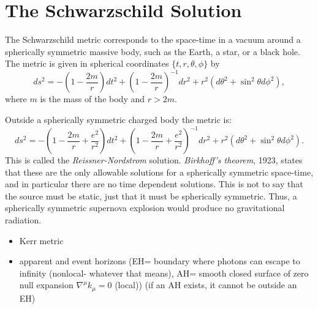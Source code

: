 \section{The Schwarzschild Solution}
The Schwarzschild metric corresponds to the space-time in a vacuum around a spherically symmetric massive body, such as the Earth, a star, or a black hole. The metric is given in spherical coordinates $\{t,r,\theta,\phi\}$ by
\begin{equation} d s^2 = -\left(1-\frac{2m}{r}\right)d t^2+\left(1-\frac{2m}{r}\right)^{-1}d r^2 + r^2(d \theta^2 + \sin^2 \theta d \phi^2), \label{Schwarzschild} \end{equation}
where $m$ is the mass of the body and $r>2m$. 

Outside a spherically symmetric charged body the metric is:
\begin{equation} d s^2 = -\left(1-\frac{2m}{r} + \frac{e^2}{r^2}\right)d t^2+\left(1-\frac{2m}{r}+\frac{e^2}{r^2}\right)^{-1}d r^2 + r^2(d \theta^2 + \sin^2 \theta d \phi^2). \label{eq:R-N}
\end{equation}
This is called the \textit{Reissner-Nordstrom} solution. \textit{Birkhoff's theorem}, 1923, states that these are the only allowable solutions for a spherically symmetric space-time, and in particular there are no time dependent solutions. This is not to say that the source must be static, just that it must be spherically symmetric. Thus, a spherically symmetric supernova explosion would produce no gravitational radiation. 

\begin{itemize}
\item Kerr metric
\item apparent and event horizons (EH= boundary where photons can escape to infinity (nonlocal- whatever that means), AH= smooth closed surface of zero null expansion $\nabla^\mu k_\mu =0$ (local)) (if an AH exists, it cannot be outside an EH)
\end{itemize}


